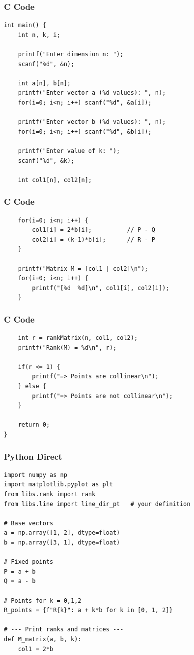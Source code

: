 \documentclass{beamer}
\begin{document}
\begin{frame}[fragile]
    \frametitle{C Code}
    \begin{lstlisting}
int main() {
    int n, k, i;

    printf("Enter dimension n: ");
    scanf("%d", &n);

    int a[n], b[n];
    printf("Enter vector a (%d values): ", n);
    for(i=0; i<n; i++) scanf("%d", &a[i]);

    printf("Enter vector b (%d values): ", n);
    for(i=0; i<n; i++) scanf("%d", &b[i]);

    printf("Enter value of k: ");
    scanf("%d", &k);

    int col1[n], col2[n];
    \end{lstlisting}
    \end{frame}
\begin{frame}[fragile]
    \frametitle{C Code}
    \begin{lstlisting}
    for(i=0; i<n; i++) {
        col1[i] = 2*b[i];          // P - Q
        col2[i] = (k-1)*b[i];      // R - P
    }

    printf("Matrix M = [col1 | col2]\n");
    for(i=0; i<n; i++) {
        printf("[%d  %d]\n", col1[i], col2[i]);
    }
\end{lstlisting}
    \end{frame}
\begin{frame}[fragile]
    \frametitle{C Code}
    \begin{lstlisting}
    int r = rankMatrix(n, col1, col2);
    printf("Rank(M) = %d\n", r);

    if(r <= 1) {
        printf("=> Points are collinear\n");
    } else {
        printf("=> Points are not collinear\n");
    }

    return 0;
}
    \end{lstlisting}
\end{frame}

\begin{frame}[fragile]
    \frametitle{Python Direct}
    \begin{lstlisting}
import numpy as np
import matplotlib.pyplot as plt
from libs.rank import rank
from libs.line import line_dir_pt   # your definition

# Base vectors
a = np.array([1, 2], dtype=float)
b = np.array([3, 1], dtype=float)

# Fixed points
P = a + b
Q = a - b

# Points for k = 0,1,2
R_points = {f"R{k}": a + k*b for k in [0, 1, 2]}

# --- Print ranks and matrices ---
def M_matrix(a, b, k):
    col1 = 2*b
     \end{lstlisting}
\end{frame}
\end{document}
